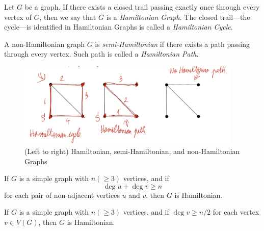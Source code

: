 \begin{definition}
  Let \(G\) be a graph. If there exists a closed trail passing exactly once
  through every vertex of \(G\), then we say that \(G\) is a \textit{Hamiltonian
  Graph}. The closed trail---the cycle---is identified in Hamiltonian Graphs is
  called a \textit{Hamiltonian Cycle}.
\end{definition}

\begin{definition}
  A non-Hamiltonian graph \(G\) is \textit{semi-Hamiltonian} if there exists a
  path passing through every vertex. Such path is called a \textit{Hamiltonian
  Path}.
\end{definition}

\begin{figure}[ht]
  \begin{center}
    \includegraphics[width=0.95\textwidth]{figures/l03/hamiltonian-graphs}
  \end{center}
  \caption{(Left to right) Hamiltonian, semi-Hamiltonian, and non-Hamiltonian
  Graphs}\label{fig:hamiltonian-graphs-examples}
\end{figure}

\begin{theorem}[Ore, 1960]
  If \(G\) is a simple graph with \(n (\geq 3)\) vertices, and if 
  \[ \deg u + \deg v \geq n \]
  for each pair of non-adjacent vertices \(u\) and \(v\), then \(G\) is
  Hamiltonian.
\end{theorem}

\begin{corollary}[Dirac, 1952]
  If \(G\) is a simple graph with \(n (\geq 3)\) vertices, and if \(\deg v \geq
  n/2\) for each vertex \(v \in V(G)\), then \(G\) is Hamiltonian.
\end{corollary}
